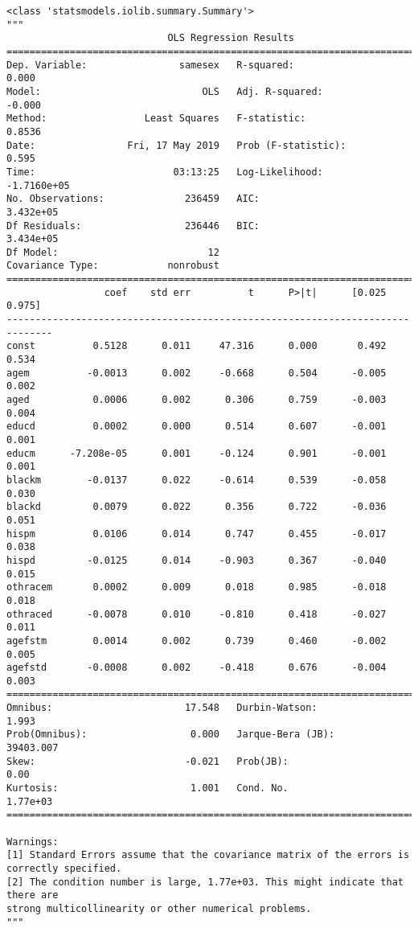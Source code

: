 \documentclass[11pt]{article}
\begin{document}
    \begin{verbatim}
<class 'statsmodels.iolib.summary.Summary'>
"""
                            OLS Regression Results                            
==============================================================================
Dep. Variable:                samesex   R-squared:                       0.000
Model:                            OLS   Adj. R-squared:                 -0.000
Method:                 Least Squares   F-statistic:                    0.8536
Date:                Fri, 17 May 2019   Prob (F-statistic):              0.595
Time:                        03:13:25   Log-Likelihood:            -1.7160e+05
No. Observations:              236459   AIC:                         3.432e+05
Df Residuals:                  236446   BIC:                         3.434e+05
Df Model:                          12                                         
Covariance Type:            nonrobust                                         
==============================================================================
                 coef    std err          t      P>|t|      [0.025      0.975]
------------------------------------------------------------------------------
const          0.5128      0.011     47.316      0.000       0.492       0.534
agem          -0.0013      0.002     -0.668      0.504      -0.005       0.002
aged           0.0006      0.002      0.306      0.759      -0.003       0.004
educd          0.0002      0.000      0.514      0.607      -0.001       0.001
educm      -7.208e-05      0.001     -0.124      0.901      -0.001       0.001
blackm        -0.0137      0.022     -0.614      0.539      -0.058       0.030
blackd         0.0079      0.022      0.356      0.722      -0.036       0.051
hispm          0.0106      0.014      0.747      0.455      -0.017       0.038
hispd         -0.0125      0.014     -0.903      0.367      -0.040       0.015
othracem       0.0002      0.009      0.018      0.985      -0.018       0.018
othraced      -0.0078      0.010     -0.810      0.418      -0.027       0.011
agefstm        0.0014      0.002      0.739      0.460      -0.002       0.005
agefstd       -0.0008      0.002     -0.418      0.676      -0.004       0.003
==============================================================================
Omnibus:                       17.548   Durbin-Watson:                   1.993
Prob(Omnibus):                  0.000   Jarque-Bera (JB):            39403.007
Skew:                          -0.021   Prob(JB):                         0.00
Kurtosis:                       1.001   Cond. No.                     1.77e+03
==============================================================================

Warnings:
[1] Standard Errors assume that the covariance matrix of the errors is correctly specified.
[2] The condition number is large, 1.77e+03. This might indicate that there are
strong multicollinearity or other numerical problems.
"""
    \end{verbatim}
\end{document}
